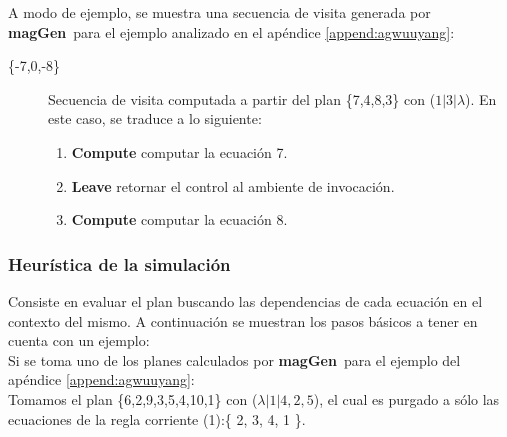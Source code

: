 \documentclass[runningheads,a4paper]{llncs}
\newcommand{\maggen}{\textbf{magGen}}
\begin{document}
A modo de ejemplo, se muestra una secuencia de visita generada por \maggen\ para el ejemplo analizado en el apéndice \ref{append:agwuuyang}:

\begin{description}
\item [\{-7,0,-8\}] Secuencia de visita computada a partir del plan \{7,4,8,3\} con  ($ 1 | 3 | \lambda$). En este caso, se traduce a lo siguiente:

\begin{enumerate}
\item \textbf{Compute} computar la ecuación 7.
\item \textbf{Leave} retornar el control al ambiente de invocación.
\item \textbf{Compute} computar la ecuación 8.
\end{enumerate}

\end{description}

\subsubsection{Heurística de la simulación}
\label{subsec:heuris-simul}

Consiste en evaluar el plan buscando las dependencias de cada ecuación en el contexto del mismo. A continuación se muestran los pasos básicos a tener en cuenta con un ejemplo:\\

Si se toma uno de los planes calculados por \maggen\ para el ejemplo del apéndice \ref{append:agwuuyang}:\\

Tomamos el plan \{6,2,9,3,5,4,10,1\} con ($\lambda| 1 | 4,2,5$), el cual es purgado a sólo las ecuaciones de la regla corriente (1):\{ 2, 3, 4, 1 \}.
\end{document}
